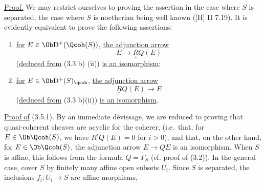 \uline{Proof.} We may restrict ourselves to proving the assertion in the case where $S$ is separated, the case where $S$ is noetherian being well known ([H] II 7.19). It is evidently equivalent to prove the following assertions:

\begin{enumerate}[label={(3.5.\arabic*)~:}]
\item \uline{for} $E\in\Ob\mathrm D^+(\Qcoh(S))$, \uline{the adjunction arrow}
\[
 E\longrightarrow \underline{\underline{R}}Q(E)
\]
(\uline{deduced from} (3.3 b) (ii)) \uline{is an isomorphism};
\item \uline{for} $E\in\Ob\mathrm D^+(S)_{\qcoh}$, \uline{the adjunction arrow}
\[
 \underline{\underline{R}}Q(E)\longrightarrow E
\]
(\uline{deduced from} (3.3 b)(ii)) \uline{is an isomorphism}.
\end{enumerate}

\uline{Proof of} (3.5.1). By an immediate dévissage, we are reduced to proving that quasi-coherent sheaves are acyclic for the coherer, (i.e.\ that, for $E\in\Ob\Qcoh(S)$, we have $R^iQ(E)=0$ for $i>0$), and that, on the other hand, for $E\in\Ob\Qcoh(S)$, the adjunction arrow $E\longrightarrow QE$ is an isomorphism. When $S$ is affine, this follows from the formula $Q=\widetilde{\Gamma}_S$ (cf. proof of (3.2)). In the general case, cover $S$ by finitely many affine open subsets $U_i$. Since $S$ is separated, the inclusions $f_i:U_i\longrightarrow S$ are affine morphisms,
